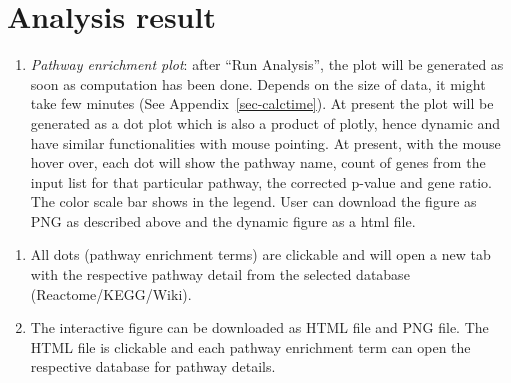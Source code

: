\documentclass[
  a4paper,
  oneside,
  open=any]{scrreport}
\providecommand{\tightlist}{%
  \setlength{\itemsep}{0pt}\setlength{\parskip}{0pt}}\usepackage{longtable,booktabs,array}
\begin{document}
\hypertarget{analysis-result-5}{%
\section{Analysis result}\label{analysis-result-5}}

\begin{enumerate}
\def\labelenumi{\arabic{enumi}.}
\tightlist
\item
  \emph{Pathway enrichment plot}: after ``Run Analysis'', the plot will
  be generated as soon as computation has been done. Depends on the size
  of data, it might take few minutes (See Appendix~\ref{sec-calctime}).
  At present the plot will be generated as a dot plot which is also a
  product of plotly, hence dynamic and have similar functionalities with
  mouse pointing. At present, with the mouse hover over, each dot will
  show the pathway name, count of genes from the input list for that
  particular pathway, the corrected p-value and gene ratio. The color
  scale bar shows in the legend. User can download the figure as PNG as
  described above and the dynamic figure as a html file.\\
\end{enumerate}

\begin{tcolorbox}[enhanced jigsaw, bottomrule=.15mm, left=2mm, coltitle=black, breakable, colback=white, arc=.35mm, rightrule=.15mm, opacitybacktitle=0.6, toptitle=1mm, leftrule=.75mm, toprule=.15mm, bottomtitle=1mm, opacityback=0, colbacktitle=quarto-callout-note-color!10!white, titlerule=0mm, colframe=quarto-callout-note-color-frame, title=\textcolor{quarto-callout-note-color}{\faInfo}\hspace{0.5em}{Note}]

\begin{enumerate}
\def\labelenumi{\arabic{enumi}.}
\tightlist
\item
  All dots (pathway enrichment terms) are clickable and will open a new
  tab with the respective pathway detail from the selected database
  (Reactome/KEGG/Wiki).
\item
  The interactive figure can be downloaded as HTML file and PNG file.
  The HTML file is clickable and each pathway enrichment term can open
  the respective database for pathway details.
\end{enumerate}

\end{tcolorbox}
\end{document}
